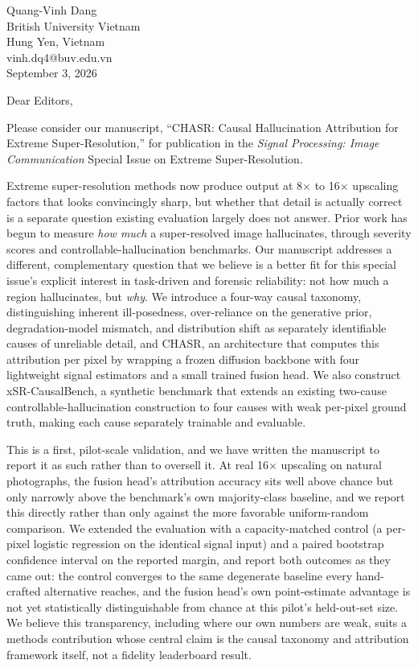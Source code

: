 \documentclass[11pt]{article}
\begin{document}
\begin{flushright}
Quang-Vinh Dang \\
British University Vietnam \\
Hung Yen, Vietnam \\
vinh.dq4@buv.edu.vn \\
September 3, 2026
\end{flushright}

Dear Editors,

Please consider our manuscript, ``CHASR: Causal Hallucination Attribution for Extreme Super-Resolution,'' for publication in the \emph{Signal Processing: Image Communication} Special Issue on Extreme Super-Resolution.

Extreme super-resolution methods now produce output at 8$\times$ to 16$\times$ upscaling factors that looks convincingly sharp, but whether that detail is actually correct is a separate question existing evaluation largely does not answer. Prior work has begun to measure \emph{how much} a super-resolved image hallucinates, through severity scores and controllable-hallucination benchmarks. Our manuscript addresses a different, complementary question that we believe is a better fit for this special issue's explicit interest in task-driven and forensic reliability: not how much a region hallucinates, but \emph{why}. We introduce a four-way causal taxonomy, distinguishing inherent ill-posedness, over-reliance on the generative prior, degradation-model mismatch, and distribution shift as separately identifiable causes of unreliable detail, and CHASR, an architecture that computes this attribution per pixel by wrapping a frozen diffusion backbone with four lightweight signal estimators and a small trained fusion head. We also construct xSR-CausalBench, a synthetic benchmark that extends an existing two-cause controllable-hallucination construction to four causes with weak per-pixel ground truth, making each cause separately trainable and evaluable.

This is a first, pilot-scale validation, and we have written the manuscript to report it as such rather than to oversell it. At real 16$\times$ upscaling on natural photographs, the fusion head's attribution accuracy sits well above chance but only narrowly above the benchmark's own majority-class baseline, and we report this directly rather than only against the more favorable uniform-random comparison. We extended the evaluation with a capacity-matched control (a per-pixel logistic regression on the identical signal input) and a paired bootstrap confidence interval on the reported margin, and report both outcomes as they came out: the control converges to the same degenerate baseline every hand-crafted alternative reaches, and the fusion head's own point-estimate advantage is not yet statistically distinguishable from chance at this pilot's held-out-set size. We believe this transparency, including where our own numbers are weak, suits a methods contribution whose central claim is the causal taxonomy and attribution framework itself, not a fidelity leaderboard result.
\end{document}
